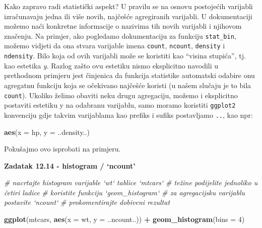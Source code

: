 \documentclass[]{book}
\newenvironment{Shaded}{\begin{snugshade}}{\end{snugshade}}
\newcommand{\KeywordTok}[1]{\textcolor[rgb]{0.13,0.29,0.53}{\textbf{#1}}}
\newcommand{\DataTypeTok}[1]{\textcolor[rgb]{0.13,0.29,0.53}{#1}}
\newcommand{\DecValTok}[1]{\textcolor[rgb]{0.00,0.00,0.81}{#1}}
\newcommand{\StringTok}[1]{\textcolor[rgb]{0.31,0.60,0.02}{#1}}
\newcommand{\CommentTok}[1]{\textcolor[rgb]{0.56,0.35,0.01}{\textit{#1}}}
\newcommand{\OperatorTok}[1]{\textcolor[rgb]{0.81,0.36,0.00}{\textbf{#1}}}
\newcommand{\NormalTok}[1]{#1}
\theoremstyle{definition}
\theoremstyle{definition}
\theoremstyle{definition}
\theoremstyle{remark}
\begin{document}
Kako zapravo radi statistički aspekt? U pravilu se na osnovu postojećih
varijabli izračunavaju jedna ili više novih, najčešće agregiranih
varijabli. U dokumentaciji možemo naći konkretne informacije o nazivima
tih novih varijabli i njihovom značenju. Na primjer, ako pogledamo
dokumentaciju za funkciju \texttt{stat\_bin}, možemo vidjeti da ona
stvara varijable imena \texttt{count}, \texttt{ncount}, \texttt{density}
i \texttt{ndensity}. Bilo koja od ovih varijabli može se koristiti kao
``visina stupića'', tj. kao estetika \emph{y}. Razlog zašto ovu estetiku
nismo eksplicitno navodili u prethodnom primjeru jest činjenica da
funkcija statistike automatski odabire onu agregatnu funkciju koja se
očekivano najčešće koristi (u našem slučaju je to bila \texttt{count}).
Ukoliko želimo obaviti neku drugu agregaciju, možemo i eksplicitno
postaviti estetiku y na odabranu varijablu, samo moramo koristiti
\texttt{ggplot2} konvenciju gdje takvim varijablama kao prefiks i sufiks
postavljamo \texttt{..}, kao npr:

\begin{Shaded}
\begin{Highlighting}[]
\KeywordTok{aes}\NormalTok{(}\DataTypeTok{x =}\NormalTok{ hp, }\DataTypeTok{y =}\NormalTok{ ..density..)}
\end{Highlighting}
\end{Shaded}

Pokušajmo ovo isprobati na primjeru.

\textbf{Zadatak 12.14 - histogram / `ncount'}

\begin{Shaded}
\begin{Highlighting}[]
\CommentTok{# nacrtajte histogram varijable `wt` tablice `mtcars`}
\CommentTok{# težine podijelite jednoliko u četiri ladice}
\CommentTok{# koristite funkciju `geom_histogram`}
\CommentTok{# za agregacijsku varijablu postavite `ncount` }
\CommentTok{# prokomentirajte dobiveni rezultat}
\end{Highlighting}
\end{Shaded}

\begin{Shaded}
\begin{Highlighting}[]
\KeywordTok{ggplot}\NormalTok{(mtcars, }\KeywordTok{aes}\NormalTok{(}\DataTypeTok{x =}\NormalTok{ wt, }\DataTypeTok{y =}\NormalTok{ ..ncount..)) }\OperatorTok{+}\StringTok{ }\KeywordTok{geom_histogram}\NormalTok{(}\DataTypeTok{bins =} \DecValTok{4}\NormalTok{)}
\end{Highlighting}
\end{Shaded}
\end{document}
